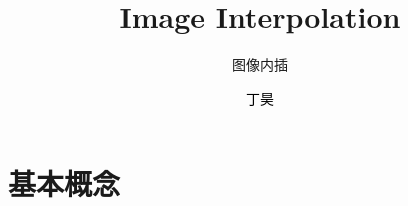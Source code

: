 \documentclass[notheorems,serif,table,compress]{beamer}  %
\begin{document}
\title{Image Interpolation}
\subtitle{图像内插}
\author[]{\textcolor{black}{丁昊}}
\frame{ \titlepage }
\def\hilite<#1>{\temporal<#1>{\color{blue!15}}{\color{black}}{\color{black}}}
\newcommand{\shadow}[2][purple]{\hskip5pt\shadowbox{\color{#1}\small \kai #2\vspace{3mm}}}
\newcommand{\colorrbox}[2][purple]{\doublebox{\color{#1}\small \kai#2}}


\section{基本概念}
\end{document}
